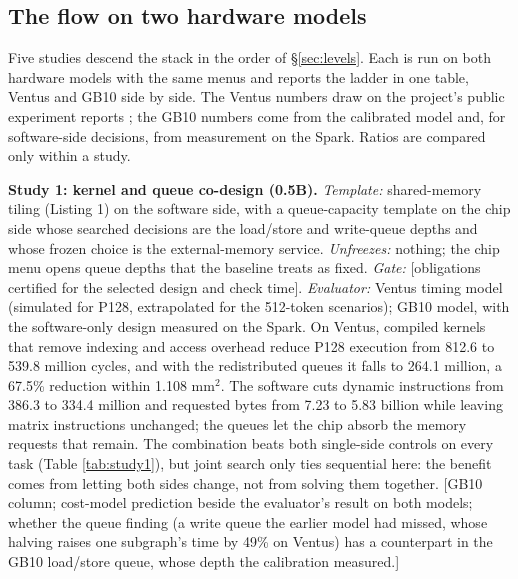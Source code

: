 \documentclass[11pt]{article}
\newcommand{\pending}[1]{\textcolor{red!65!black}{[#1]}}
\begin{document}
\subsection{The flow on two hardware models}\label{sec:eval-flow}

Five studies descend the stack in the order of §\ref{sec:levels}. Each is run on both hardware models with the same menus and reports the ladder in one table, Ventus and GB10 side by side. The Ventus numbers draw on the project's public experiment reports \cite{r96,r97,r98,r99,r100}; the GB10 numbers come from the calibrated model and, for software-side decisions, from measurement on the Spark. Ratios are compared only within a study.

\textbf{Study 1: kernel and queue co-design (0.5B).} \emph{Template:} shared-memory tiling (Listing 1) on the software side, with a queue-capacity template on the chip side whose searched decisions are the load/store and write-queue depths and whose frozen choice is the external-memory service. \emph{Unfreezes:} nothing; the chip menu opens queue depths that the baseline treats as fixed. \emph{Gate:} \pending{obligations certified for the selected design and check time}. \emph{Evaluator:} Ventus timing model (simulated for P128, extrapolated for the 512-token scenarios); GB10 model, with the software-only design measured on the Spark. On Ventus, compiled kernels that remove indexing and access overhead reduce P128 execution from 812.6 to 539.8 million cycles, and with the redistributed queues it falls to 264.1 million, a 67.5\% reduction within 1.108 mm\(^2\). The software cuts dynamic instructions from 386.3 to 334.4 million and requested bytes from 7.23 to 5.83 billion while leaving matrix instructions unchanged; the queues let the chip absorb the memory requests that remain. The combination beats both single-side controls on every task (Table \ref{tab:study1}), but joint search only ties sequential here: the benefit comes from letting both sides change, not from solving them together. \pending{GB10 column; cost-model prediction beside the evaluator's result on both models; whether the queue finding (a write queue the earlier model had missed, whose halving raises one subgraph's time by 49\% on Ventus) has a counterpart in the GB10 load/store queue, whose depth the calibration measured.}
\end{document}
